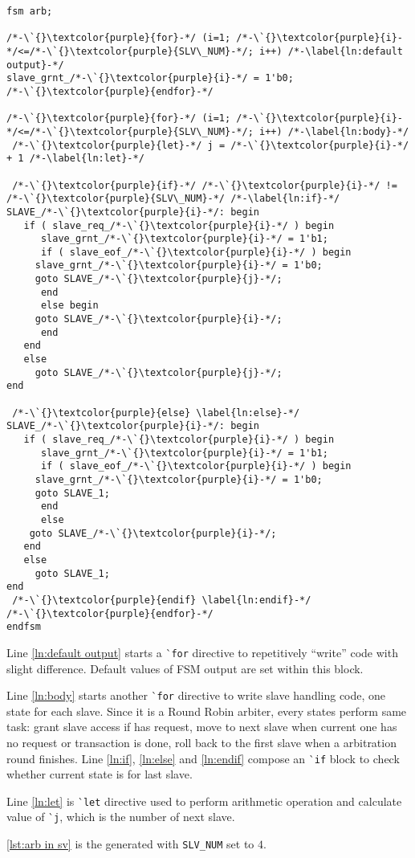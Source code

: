 \begin{minipage}[t]{.45\textwidth}
\begin{lstlisting}[caption={Configurable Arbiter}, label={lst:arb in pp}]
fsm arb; 

/*-\`{}\textcolor{purple}{for}-*/ (i=1; /*-\`{}\textcolor{purple}{i}-*/<=/*-\`{}\textcolor{purple}{SLV\_NUM}-*/; i++) /*-\label{ln:default output}-*/
slave_grnt_/*-\`{}\textcolor{purple}{i}-*/ = 1'b0;
/*-\`{}\textcolor{purple}{endfor}-*/

/*-\`{}\textcolor{purple}{for}-*/ (i=1; /*-\`{}\textcolor{purple}{i}-*/<=/*-\`{}\textcolor{purple}{SLV\_NUM}-*/; i++) /*-\label{ln:body}-*/
 /*-\`{}\textcolor{purple}{let}-*/ j = /*-\`{}\textcolor{purple}{i}-*/ + 1 /*-\label{ln:let}-*/

 /*-\`{}\textcolor{purple}{if}-*/ /*-\`{}\textcolor{purple}{i}-*/ != /*-\`{}\textcolor{purple}{SLV\_NUM}-*/ /*-\label{ln:if}-*/
SLAVE_/*-\`{}\textcolor{purple}{i}-*/: begin
   if ( slave_req_/*-\`{}\textcolor{purple}{i}-*/ ) begin
      slave_grnt_/*-\`{}\textcolor{purple}{i}-*/ = 1'b1;
      if ( slave_eof_/*-\`{}\textcolor{purple}{i}-*/ ) begin
	 slave_grnt_/*-\`{}\textcolor{purple}{i}-*/ = 1'b0;
	 goto SLAVE_/*-\`{}\textcolor{purple}{j}-*/;
      end
      else begin
	 goto SLAVE_/*-\`{}\textcolor{purple}{i}-*/;
      end
   end
   else 
     goto SLAVE_/*-\`{}\textcolor{purple}{j}-*/;
end

 /*-\`{}\textcolor{purple}{else} \label{ln:else}-*/ 
SLAVE_/*-\`{}\textcolor{purple}{i}-*/: begin 
   if ( slave_req_/*-\`{}\textcolor{purple}{i}-*/ ) begin
      slave_grnt_/*-\`{}\textcolor{purple}{i}-*/ = 1'b1;
      if ( slave_eof_/*-\`{}\textcolor{purple}{i}-*/ ) begin
	 slave_grnt_/*-\`{}\textcolor{purple}{i}-*/ = 1'b0;
	 goto SLAVE_1;
      end
      else 
	goto SLAVE_/*-\`{}\textcolor{purple}{i}-*/;
   end
   else 
     goto SLAVE_1;
end  
 /*-\`{}\textcolor{purple}{endif} \label{ln:endif}-*/
/*-\`{}\textcolor{purple}{endfor}-*/
endfsm
\end{lstlisting}
\end{minipage}
\begin{minipage}[t]{.5\textwidth}
\vspace{2ex}
Line \autoref{ln:default output} starts a \`{}\texttt{for} directive to repetitively 
``write'' code with slight difference. Default values of FSM output are set within 
this block. 

Line \autoref{ln:body} starts another \`{}\texttt{for} directive to write slave handling
code, one state for each slave. 
Since it is a Round Robin arbiter, every states perform same task: grant slave access if
has request, move to next slave when current one has no request or transaction is done, 
roll back to the first slave when a arbitration round finishes. Line \autoref{ln:if}, 
\autoref{ln:else} and \autoref{ln:endif} compose an \`{}\texttt{if} block to check
whether current state is for last slave. 

Line \autoref{ln:let} is \`{}\texttt{let} directive used to perform arithmetic operation 
and calculate value of \`{}\texttt{j}, which is the number of next slave.

\autoref{lst:arb in sv} is the generated \sv{} with \texttt{SLV\_NUM} set to $4$. 
\end{minipage}

